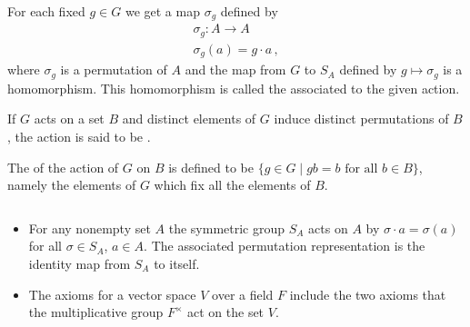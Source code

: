 For each fixed $g \in G$ we get a map $\sigma_g$ defined by 
\begin{gather}
	\sigma_g: A \to A \\
	\sigma_g(a) = g \cdot a\,,
\end{gather}
where $\sigma_g$ is a permutation of $A$ and the map from $G$ to 
$S_A$ defined by $g \mapsto \sigma_g$ is a homomorphism. This 
homomorphism is called the  associated to the given action.

If $G$ acts on a set $B$ and distinct elements of $G$ induce 
distinct permutations of $B$, the action is said to be 
.

The  of the 
action of $G$ on $B$ is defined to be $\{ g \in G \mid gb = b 
\text{ for all } b \in B \}$, namely the elements of $G$ which fix 
all the elements of $B$.

\begin{example}
	$ $
	\begin{itemize}
		\item For any nonempty set $A$ the symmetric group $S_A$ 
		acts on $A$ by $\sigma \cdot a = \sigma(a)$ for all $\sigma 
		\in S_A$, $a \in A$. The associated permutation 
		representation is the identity map from $S_A$ to itself.
		
		\item The axioms for a vector space $V$ over a field $F$ 
		include the two axioms that the multiplicative group 
		$F^\times$ act on the set $V$.
	\end{itemize}
\end{example}































